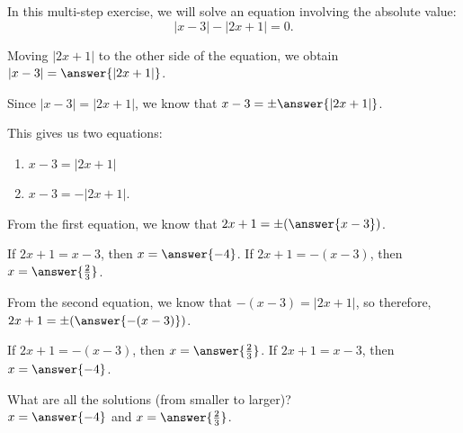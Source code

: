 \documentclass{ximera}
\author{Elizabeth Campolongo, Kenneth Berglund}
\begin{document}
In this multi-step exercise, we will solve an equation involving the absolute value: 
$$|x - 3| - |2x + 1| = 0.$$

\begin{exercise}
Moving $|2x + 1|$ to the other side of the equation, we obtain $|x -3| = \answer{|2x + 1|}$.

\begin{exercise}
Since $|x - 3| = |2x + 1|$, we know that $x - 3 = \pm \answer{|2x + 1|}$. 

\begin{exercise}
This gives us two equations:
\begin{enumerate}
\item $x - 3 = |2x + 1|$
\item $x - 3 = - |2x + 1|$. 
\end{enumerate}
From the first equation, we know that $2x + 1 = \pm(\answer{x - 3})$.
\begin{exercise}
If $2x + 1 = x - 3$, then $x = \answer{-4}$. If $2x + 1 = -(x - 3)$, then $x = \answer{\frac{2}{3}}$. 
\end{exercise}
From the second equation, we know that $-(x - 3) = |2x + 1|$, so therefore, $2x + 1 = \pm(\answer{-(x - 3)})$. 
\begin{exercise}
If $2x + 1 = -(x - 3)$, then $x = \answer{\frac{2}{3}}$. If $2x + 1 = x - 3$, then $x = \answer{-4}$. 
\end{exercise}
\begin{exercise}
What are all the solutions (from smaller to larger)?\\
$x=\answer{-4}$ and $x = \answer{\frac{2}{3}}$. 

\end{exercise}
\end{exercise}
\end{exercise}
\end{exercise}
\end{document}
